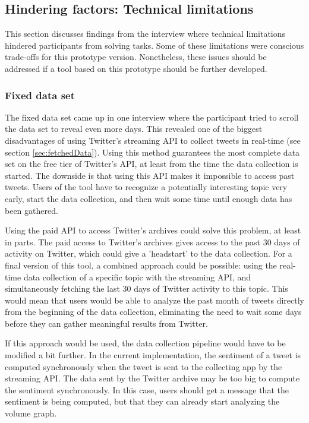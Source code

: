 \subsection{Hindering factors: Technical limitations}
This section discusses findings from the interview where technical limitations hindered participants from solving tasks. Some of these limitations were conscious trade-offs for this prototype version. Nonetheless, these issues should be addressed if a tool based on this prototype should be further developed.

\subsubsection*{Fixed data set} \label{sec:fixedDataSet}
The fixed data set came up in one interview where the participant tried to scroll the data set to reveal even more days. This revealed one of the biggest disadvantages of using Twitter's streaming API to collect tweets in real-time (see section \ref{sec:fetchedData}). Using this method guarantees the most complete data set on the free tier of Twitter's API, at least from the time the data collection is started. The downside is that using this API makes it impossible to access past tweets. Users of the tool have to recognize a potentially interesting topic very early, start the data collection, and then wait some time until enough data has been gathered.

Using the paid API to access Twitter's archives could solve this problem, at least in parts. The paid access to Twitter's archives gives access to the past 30 days of activity on Twitter, which could give a 'headstart' to the data collection. For a final version of this tool, a combined approach could be possible: using the real-time data collection of a specific topic with the streaming API, and simultaneously fetching the last 30 days of Twitter activity to this topic. This would mean that users would be able to analyze the past month of tweets directly from the beginning of the data collection, eliminating the need to wait some days before they can gather meaningful results from Twitter.

If this approach would be used, the data collection pipeline would have to be modified a bit further. In the current implementation, the sentiment of a tweet is computed synchronously when the tweet is sent to the collecting app by the streaming API. The data sent by the Twitter archive may be too big to compute the sentiment synchronously. In this case, users should get a message that the sentiment is being computed, but that they can already start analyzing the volume graph.

